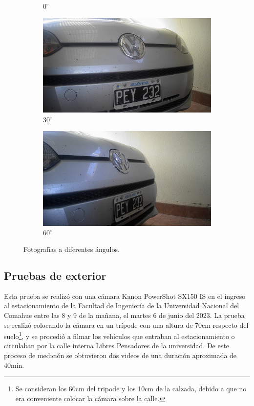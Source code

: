 \begin{figure}[bth]
\begin{subfigure}{.15\textwidth}
        \caption{$0^\circ$}
    \end{subfigure}
    \begin{subfigure}{.15\textwidth}
        \centering
        \includegraphics[width=\textwidth]{imgs/test-angulos/30_50.jpg}
        \caption{$30^\circ$}
    \end{subfigure}
    \begin{subfigure}{.15\textwidth}
        \centering
        \includegraphics[width=\textwidth]{imgs/test-angulos/60_50.jpg}
        \caption{$60^\circ$}
    \end{subfigure}
    \caption{Fotografías a diferentes ángulos.}
    \label{fig:fotos-angulo}
\end{figure}

\subsection{Pruebas de exterior}
Esta prueba se realizó con una cámara Kanon PowerShot SX150 IS \cite{kanon_powershot_nodate} en el ingreso al estacionamiento de la Facultad de Ingeniería de la Universidad Nacional del Comahue entre las 8 y 9 de la mañana, el martes 6 de junio del 2023. La prueba se realizó colocando la cámara en un trípode con una altura de 70cm respecto del suelo\footnote{Se consideran los 60cm del tripode y los 10cm de la calzada, debido a que no era conveniente colocar la cámara sobre la calle.}, y se procedió a filmar los vehículos que entraban al estacionamiento o circulaban por la calle interna Libres Pensadores de la universidad. De este proceso de medición se obtuvieron dos videos de una duración aproximada de 40min.

